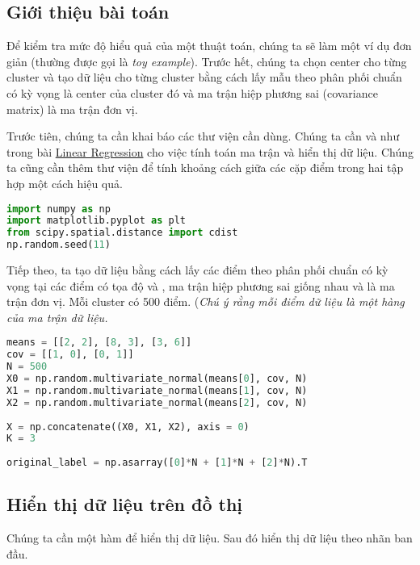  
\subsection{Giới thiệu bài toán}
 
Để kiểm tra mức độ hiểu quả của một thuật toán, chúng ta sẽ làm một ví dụ đơn giản (thường được gọi là \textit{toy example}). Trước hết, chúng ta chọn center cho từng cluster và tạo dữ liệu cho từng cluster bằng cách lấy mẫu theo phân phối chuẩn có kỳ vọng là center của cluster đó và ma trận hiệp phương sai (covariance matrix) là ma trận đơn vị.  
 
Trước tiên, chúng ta cần khai báo các thư viện cần dùng. Chúng ta cần  và  như trong bài \href{http://machinelearningcoban.com/2016/12/28/linearregression/}{Linear Regression} cho việc tính toán ma trận và hiển thị dữ liệu. Chúng ta cũng cần thêm thư viện  để tính khoảng cách giữa các cặp điểm trong hai tập hợp một cách hiệu quả. 
 
 
\begin{lstlisting}[language=Python]
import numpy as np  
import matplotlib.pyplot as plt 
from scipy.spatial.distance import cdist 
np.random.seed(11) 
\end{lstlisting}
 
Tiếp theo, ta tạo dữ liệu bằng cách lấy các điểm theo phân phối chuẩn có kỳ vọng tại các điểm có tọa độ  và , ma trận hiệp phương sai giống nhau và là ma trận đơn vị. Mỗi cluster có 500 điểm. (\textit{Chú ý rằng mỗi điểm dữ liệu là một hàng của ma trận dữ liệu.} 
 
 
\begin{lstlisting}[language=Python]
means = [[2, 2], [8, 3], [3, 6]] 
cov = [[1, 0], [0, 1]] 
N = 500 
X0 = np.random.multivariate_normal(means[0], cov, N) 
X1 = np.random.multivariate_normal(means[1], cov, N) 
X2 = np.random.multivariate_normal(means[2], cov, N) 
 
X = np.concatenate((X0, X1, X2), axis = 0) 
K = 3 
 
original_label = np.asarray([0]*N + [1]*N + [2]*N).T 
\end{lstlisting}
 
 
\subsection{Hiển thị dữ liệu trên đồ thị}
 
Chúng ta cần một hàm  để hiển thị dữ liệu. Sau đó hiển thị dữ liệu theo nhãn ban đầu. 
 
